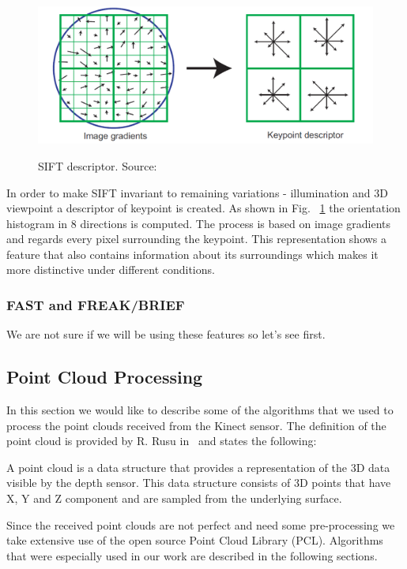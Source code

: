 \begin{figure}

{\includegraphics[width=1\columnwidth]{figures/sift.png}}

\caption{SIFT descriptor. Source:~\cite{lowe2004distinctive}}
\label{fig:sift}
\end{figure}

In order to make SIFT invariant to remaining variations - illumination and 3D viewpoint a descriptor of keypoint is created. As shown in Fig. ~\ref{fig:sift} the orientation histogram in 8 directions is computed. The process is based on image gradients and regards every pixel surrounding the keypoint. This representation shows a feature that also contains information about its surroundings which makes it more distinctive under different conditions.

\subsubsection{FAST and FREAK/BRIEF}
We are not sure if we will be using these features so let's see first.



\subsection{Point Cloud Processing}
In this section we would like to describe some of the algorithms that we used to process the point clouds received from the Kinect sensor. The definition of the point cloud is provided by R. Rusu in~\cite{Rusu_ICRA2011_PCL} and states the following:

A point cloud is a data structure that provides a representation of the 3D data visible by the depth sensor. This data structure consists of 3D points that have X, Y and Z component and are sampled from the underlying surface.  

Since the received point clouds are not perfect and need some pre-processing we take extensive use of the open source Point Cloud Library (PCL). Algorithms that were especially used in our work are described in the following sections.

